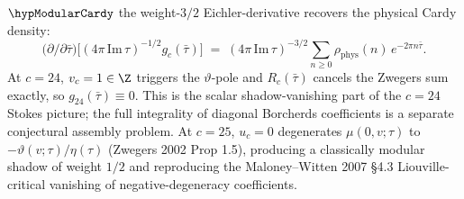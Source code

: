 \begin{theorem}
\(\hypModularCardy\) the weight-$3/2$ Eichler-derivative recovers the
physical Cardy density:
\begin{equation}
\label{eq:3dg-gc-cardy-match}
\bigl(\partial/\partial\bar\tau\bigr)\bigl[(4\pi\,\mathrm{Im}\,\tau)^{-1/2}
g_c(\bar\tau)\bigr]
\;=\;
(4\pi\,\mathrm{Im}\,\tau)^{-3/2}
\sum_{n\ge 0}\rho_{\mathrm{phys}}(n)\,e^{-2\pi n\bar\tau}.
\end{equation}
At $c = 24$, $v_c = 1 \in \Z$ triggers the $\vartheta$-pole and
$R_c(\bar\tau)$ cancels the Zwegers sum exactly, so
$g_{24}(\bar\tau) \equiv 0$. This is the scalar
shadow-vanishing part of the $c=24$ Stokes picture; the full
integrality of diagonal Borcherds coefficients is a separate
conjectural assembly problem. At $c = 25$, $u_c = 0$ degenerates
$\mu(0, v; \tau)$ to $-\vartheta(v;\tau)/\eta(\tau)$
(Zwegers 2002 Prop 1.5), producing a classically modular shadow of
weight $1/2$ and reproducing the Maloney--Witten 2007 \S 4.3
Liouville-critical vanishing of negative-degeneracy coefficients.
\end{theorem}

